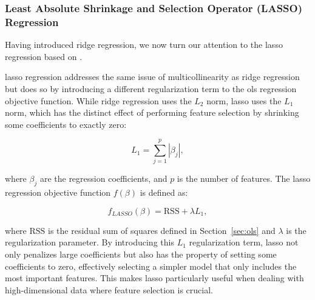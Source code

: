 \subsubsection{Least Absolute Shrinkage and Selection Operator (LASSO) Regression}
Having introduced ridge regression, we now turn our attention to the \gls{lasso} regression based on \citet{James2023AnIS}.

\gls{lasso} regression addresses the same issue of multicollinearity as ridge regression but does so by introducing a different regularization term to the \gls{ols} regression objective function.
While ridge regression uses the $L_2$ norm, \gls{lasso} uses the $L_1$ norm, which has the distinct effect of performing feature selection by shrinking some coefficients to exactly zero:

$$
L_1 = \sum_{j=1}^{p} |\beta_j|,
$$

where $\beta_j$ are the regression coefficients, and $p$ is the number of features.
The \gls{lasso} regression objective function $f(\beta)$ is defined as:

$$
f_{LASSO}(\beta) = \text{RSS} + \lambda L_1,
$$

where $\text{RSS}$ is the residual sum of squares defined in Section~\ref{sec:ols} and $\lambda$ is the regularization parameter.
By introducing this $L_1$ regularization term, \gls{lasso} not only penalizes large coefficients but also has the property of setting some coefficients to zero, effectively selecting a simpler model that only includes the most important features.
This makes \gls{lasso} particularly useful when dealing with high-dimensional data where feature selection is crucial.